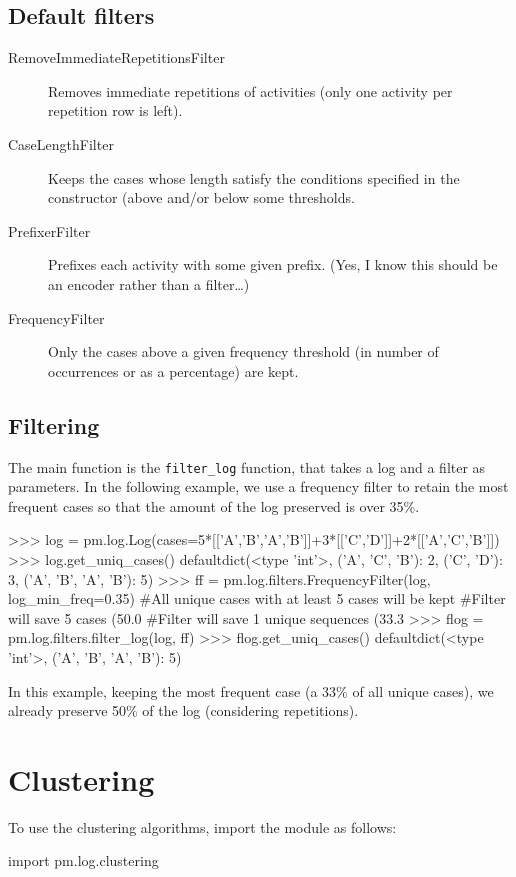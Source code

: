 \documentclass[a4paper,10pt]{book}
\begin{document}
\subsection{Default filters}
\begin{description}
 \item [RemoveImmediateRepetitionsFilter] Removes immediate repetitions of activities (only one activity per
    repetition row is left).
 \item [CaseLengthFilter] Keeps the cases whose length satisfy the conditions specified in the
    constructor (above and/or below some thresholds.
 \item [PrefixerFilter] Prefixes each activity with some given prefix. (Yes, I know this should be an encoder rather than a filter\ldots)
 \item [FrequencyFilter] Only the cases above a given frequency threshold (in number of occurrences or as a percentage) are kept.
\end{description}

\subsection{Filtering}
The main function is the \texttt{filter\_log} function, that takes a log and a filter as parameters. In the following example, we use a frequency filter to retain the most frequent cases so that the amount of the log preserved is over 35\%.\\
\begin{pycode}
>>> log = pm.log.Log(cases=5*[['A','B','A','B']]+3*[['C','D']]+2*[['A','C','B']])
>>> log.get_uniq_cases()
defaultdict(<type 'int'>, {('A', 'C', 'B'): 2, ('C', 'D'): 3, ('A', 'B', 'A', 'B'): 5})
>>> ff = pm.log.filters.FrequencyFilter(log, log_min_freq=0.35)
#All unique cases with at least 5 cases will be kept
#Filter will save 5 cases (50.0%
#Filter will save 1 unique sequences (33.3%
>>> flog = pm.log.filters.filter_log(log, ff)
>>> flog.get_uniq_cases()
defaultdict(<type 'int'>, {('A', 'B', 'A', 'B'): 5})
\end{pycode}

In this example, keeping the most frequent case (a 33\% of all unique cases), we already preserve 50\% of the log (considering repetitions).

\section{Clustering}
To use the clustering algorithms, import the module as follows:\\
\begin{pycode}
import pm.log.clustering
\end{pycode}
\end{document}
